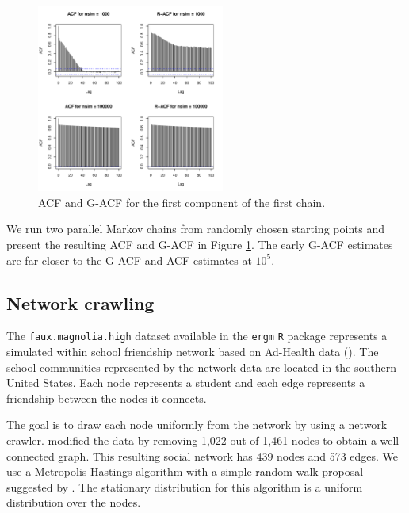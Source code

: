 \documentclass[11pt]{article}
\theoremstyle{remark}
\begin{document}
\begin{figure}[h]
    \centering
    \includegraphics[width = 0.55\textwidth]{plots/spatio-acf.pdf}
    \caption{ACF and G-ACF for the first component of the first chain.}
    \label{fig:spatio-acf_G-fl}
\end{figure}
We run two parallel Markov chains from randomly chosen starting points and present the resulting ACF and G-ACF in Figure \ref{fig:spatio-acf_G-fl}. The early G-ACF estimates are far closer to the G-ACF and ACF estimates at $10^5$.


\subsection{Network crawling}


The \texttt{faux.magnolia.high} dataset available in the \texttt{ergm} \texttt{R} package represents a simulated within school friendship network based on Ad-Health data (\cite{resnick1997protecting}). The school communities represented by the network data are located in the southern United States. Each node represents a student and each edge represents a friendship between the nodes it connects. 

The goal is to draw each node uniformly from the network by using a network crawler. \cite{nilakanta2019ensuring} modified the data by removing 1,022 out of 1,461 nodes to obtain a well-connected graph. This resulting social network has 439 nodes and 573 edges. We use a Metropolis-Hastings algorithm with a simple random-walk  proposal suggested by \cite{gjoka2011practical}. The stationary distribution for this algorithm is a uniform distribution over the nodes. 
\end{document}
